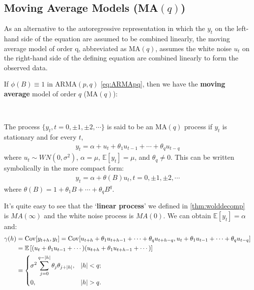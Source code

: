 \subsection{Moving Average Models (MA\texorpdfstring{$(q)$}{(q)})}\label{sec:MA}

As an alternative to the autoregressive representation in which the $y_t$ on the left-hand
side of the equation are assumed to be combined linearly, the moving average model
of order q, abbreviated as MA$(q)$, assumes the white noise $u_t$ on the right-hand side
of the defining equation are combined linearly to form the observed data.

If $\phi(B) \equiv 1$ in ARMA$(p,q)$ \ref{eq:ARMApq}, then we have the \textbf{moving average} model of order $q$ (MA$(q)$):
\begin{definition}[MA$(q)$ Process]\label{def:MAq}
    \
    
    The process $\{ y_t, t=0, \pm1, \pm2, \cdots\}$ is said to be an MA$(q)$ process if $y_t$ is stationary and for every $t$,
    \begin{gather}\label{eq:MAq}
        y_t = \alpha + u_t + \theta_1 u_{t-1} + \cdots + \theta_q u_{t-q}
    \end{gather}
    where $u_t \sim WN(0,\sigma^2)$, $\alpha = \mu$, $\mathbb{E}[y_t] = \mu$, and $\theta_q \neq 0.$
    This can be written symbolically in the more compact form:
    \begin{gather*}
        y_t = \alpha + \theta(B) u_t, t = 0, \pm1, \pm2, \cdots
    \end{gather*}
    where $\theta (B) = 1 + \theta_1 B + \cdots + \theta_q B^q$.
\end{definition}
It's quite easy to see that the `\textbf{linear process}' we defined in \ref{thm:wolddecomp} is $MA(\infty)$ and the white noise process is $MA(0)$.
We can obtain $\mathbb{E}[y_t] = \alpha$ and:
\begin{align*}
    \gamma(h) &= \operatorname{Cov}[y_{t+h}, y_t] = \operatorname{Cov}[u_{t+h} + \theta_1 u_{t+h-1} + \cdots + \theta_q u_{t+h-q}, u_t + \theta_1 u_{t-1} + \cdots + \theta_q u_{t-q}]\\
    &= \mathbb{E}\left[(u_t + \theta_1 u_{t-1} + \cdots)(u_{t+h} + \theta_1 u_{t+h-1} + \cdots)\right]\\
    &= \begin{dcases}
        \sigma^2 \sum_{j=0}^{q-\vert h\vert}\theta_j \theta_{j + \vert h \vert} , & \vert h \vert < q;\\
        0, & \vert h \vert > q.
    \end{dcases}
\end{align*}


